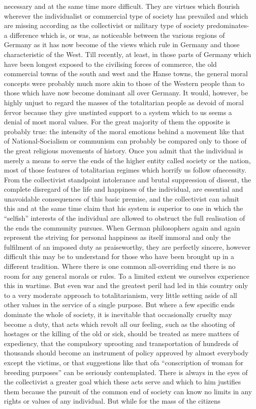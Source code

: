 \documentclass[11pt,openany]{book}
\begin{document}
necessary and at the same time more difficult. They are virtues which flourish wherever the individualist or commercial type of society has prevailed and which are missing according as the collectivist or military type of society predominates-a difference which is, or was, as noticeable between the various regions of Germany as it has now become of the views which rule in Germany and those characteristic of the West. Till recently, at least, in those parts of Germany which have been longest exposed to the civilising forces of commerce, the old commercial towns of the south and west and the Hanse towns, the general moral concepts were probably much more akin to those of the Western people than to those which have now become dominant all over Germany. It would, however, be highly unjust to regard the masses of the totalitarian people as devoid of moral fervor because they give unstinted support to a system which to us seems a denial of most moral values. For the great majority of them the opposite is probably true: the intensity of the moral emotions behind a movement like that of National-Socialism or communism can probably be compared only to those of the great religious movements of history. Once you admit that the individual is merely a means to serve the ends of the higher entity called society or the nation, most of those features of totalitarian regimes which horrify us follow ofnecessity. From the collectivist standpoint intolerance and brutal suppression of dissent, the complete disregard of the life and happiness of the individual, are essential and unavoidable consequences of this basic premise, and the collectivist can admit this and at the same time claim that his system is superior to one in which the ``selfish'' interests of the individual are allowed to obstruct the full realisation of the ends the community pursues. When German philosophers again and again represent the striving for personal happiness as itself immoral and only the fulfilment of an imposed duty as praiseworthy, they are perfectly sincere, however difficult this may be to understand for those who have been brought up in a different tradition. Where there is one common all-overriding end there is no room for any general morals or rules. To a limited extent we ourselves experience this in wartime. But even war and the greatest peril had led in this country only to a very moderate approach to totalitarianism, very little setting aside of all other values in the service of a single purpose. But where a few specific ends dominate the whole of society, it is inevitable that occasionally cruelty may become a duty, that acts which revolt all our feeling, such as the shooting of hostages or the killing of the old or sick, should be treated as mere matters of expediency, that the compulsory uprooting and transportation of hundreds of thousands should become an instrument of policy approved by almost everybody except the victims, or that suggestions like that ofa ``conscription of woman for breeding purposes'' can be seriously contemplated. There is always in the eyes of the collectivist a greater goal which these acts serve and which to him justifies them because the pursuit of the common end of society can know no limits in any rights or values of any individual. But while for the mass of the citizens 
\end{document}
